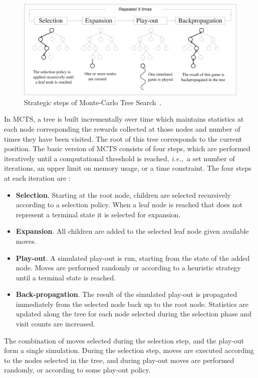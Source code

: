 \documentclass{kecsmstr}
\newcommand{\ie}{{\it i.e.,}~}
\begin{document}
\begin{figure}[ht]
	\centering
	\includegraphics[width=.85\textwidth]{img/figure1.eps}
	\caption{Strategic steps of Monte-Carlo Tree Search~\protect{}.}
	\label{fig:mcts-algorithm}
\end{figure}
\noindent In MCTS, a tree is built incrementally over time which maintains statistics at each node corresponding the rewards collected at those nodes and number of times  they have been visited. The root of this tree corresponds to the current position. The basic version of MCTS consists of four steps, which are performed iteratively until a computational threshold is reached, \ie a set number of iterations, an upper limit on memory usage, or a time constraint. The four steps at each iteration are :
\begin{itemize}
\item {\bf Selection}. Starting at the root node, children are selected recursively according to a selection policy. When a leaf node is reached that does not represent a terminal state it is selected for expansion.
\item {\bf Expansion}. All children are added to the selected leaf node given available moves.
\item {\bf Play-out}. A simulated play-out is run, starting from the state of the added node. Moves are performed randomly or according to a heuristic strategy until a terminal state is reached.
\item {\bf Back-propagation}. The result of the simulated play-out is propagated immediately from the selected node back up to the root node. Statistics are updated along the tree for each node selected during the selection phase and visit counts are increased.
\end{itemize}
The combination of moves selected during the selection step, and the play-out form a single simulation. During the selection step, moves are executed according to the nodes selected in the tree, and during play-out moves are performed randomly, or according to some play-out policy.
\end{document}
